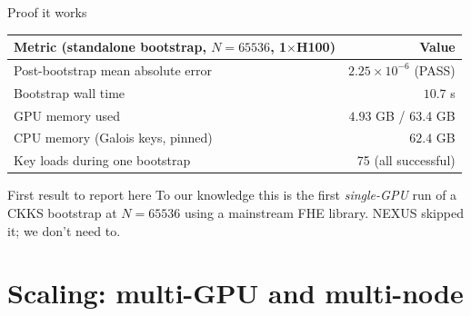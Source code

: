 \documentclass[aspectratio=169]{beamer}
\begin{document}
\begin{frame}{Proof it works}
  \begin{center}
  \begin{tabular}{@{}lr@{}}
    \toprule
    \textbf{Metric (standalone bootstrap, $N{=}65536$, 1$\times$H100)} & \textbf{Value} \\
    \midrule
    Post-bootstrap mean absolute error & $2.25\times10^{-6}$ \alert{(PASS)} \\
    Bootstrap wall time                 & $10.7$ s \\
    GPU memory used                     & $\mathbf{4.93}$ GB / 63.4 GB \\
    CPU memory (Galois keys, pinned)    & $62.4$ GB \\
    Key loads during one bootstrap      & 75 (all successful) \\
    \bottomrule
  \end{tabular}
  \end{center}
  \vspace{0.6em}
  \begin{alertblock}{First result to report here}
    To our knowledge this is the first \emph{single-GPU} run of a CKKS
    bootstrap at $N{=}65536$ using a mainstream FHE library. NEXUS skipped it;
    we don't need to.
  \end{alertblock}
\end{frame}

\section{Scaling: multi-GPU and multi-node}
\end{document}
